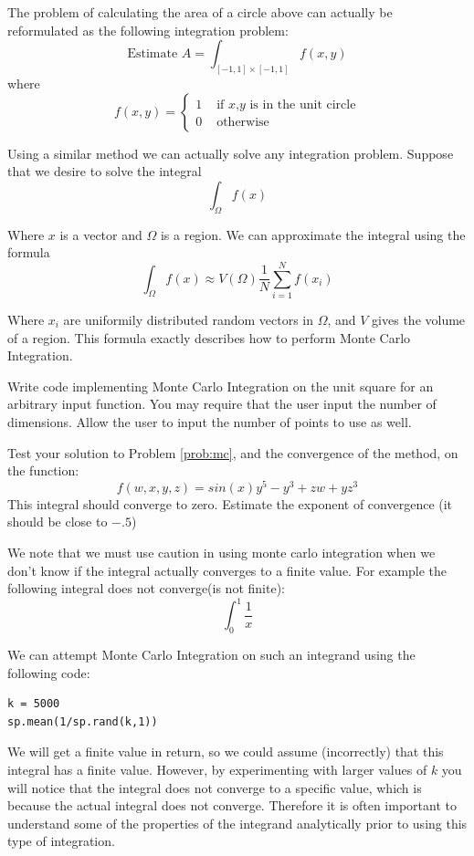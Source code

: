 The problem of calculating the area of a circle above can actually be reformulated as the following integration problem:
\[
\mbox{Estimate }A = \int_{[-1,1]\times[-1,1]} f(x,y)
\]
where
\[
f(x,y) = \begin{cases} 1 &\mbox{ if $x$,$y$ is in the unit circle} \\ 0 &\mbox{ otherwise} \end{cases}
\]

Using a similar method we can actually solve any integration problem. Suppose that we desire to solve the integral
\[
\int_\Omega f(x)
\]

Where $x$ is a vector and $\Omega$ is a region. We can approximate the integral using the formula
\[
\int_\Omega f(x) \approx V(\Omega) \frac{1}{N} \sum_{i=1}^N f(x_i)
\]

Where $x_i$ are uniformily distributed random vectors in $\Omega$, and $V$ gives the volume of a region. This formula exactly describes how to perform Monte Carlo Integration.

\begin{problem}
\label{prob:mc}
Write code implementing Monte Carlo Integration on the unit square for an arbitrary input function. You may require that the user input the number of dimensions. Allow the user to input the number of points to use as well.
\end{problem}

\begin{problem}
\label{prob:mc_test}
Test your solution to Problem \ref{prob:mc}, and the convergence of the method, on the function:
\[
f(w,x,y,z) = sin(x) y^5 -y^3 + zw + yz^3
\]
This integral should converge to zero. Estimate the exponent of convergence (it should be close to $-.5$)
\end{problem}

We note that we must use caution in using monte carlo integration when we don't know if the integral actually converges to a finite value. For example the following integral does not converge(is not finite):
\[
\int_0^1 \frac{1}{x}
\]

We can attempt Monte Carlo Integration on such an integrand using the following code:
\begin{lstlisting}[style=python]
k = 5000
sp.mean(1/sp.rand(k,1))
\end{lstlisting}

We will get a finite value in return, so we could assume (incorrectly) that this integral has a finite value. However, by experimenting with larger values of $k$ you will notice that the integral does not converge to a specific value, which is because the actual integral does not converge. Therefore it is often important to understand some of the properties of the integrand analytically prior to using this type of integration.

